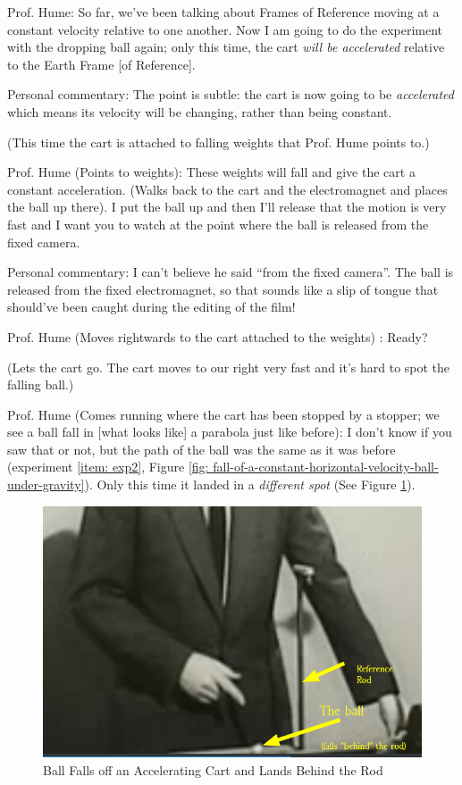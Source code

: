 \documentclass[a6paper]{article}
\newcommand{\perscom}[1]{
    {\footnotesize Personal commentary:  #1}
}
\begin{document}
Prof. Hume: So far, we've been talking about Frames of Reference moving at a constant velocity relative to one another. Now I am going to do the experiment with the dropping ball again; only this time, the cart \emph{will be accelerated} relative to the Earth Frame [of Reference].

\perscom{ The point is subtle: the cart is now going to be \emph{accelerated} which means its velocity will be changing, rather than being constant.}

(This time the cart is attached to falling weights that Prof. Hume points to.)

Prof. Hume (Points to weights): These weights will fall and give the cart a constant acceleration. (Walks back to the cart and the electromagnet and places the ball up there). I put the ball up and then I'll release that the motion is very fast and I want you to watch at the point where the ball is released from the fixed camera. 

\perscom{ I can't believe he said ``from the fixed camera''. The ball is released from the fixed electromagnet, so that sounds like a slip of tongue that should've been caught during the editing of the film! }

Prof. Hume (Moves rightwards to the cart attached to the weights) : Ready? 

(Lets the cart go. The cart moves to our right very fast and it's hard to spot the falling ball.)

Prof. Hume (Comes running where the cart has been stopped by a stopper; we see a ball fall in [what looks like] a parabola just like before): I don't know if you saw that or not, but the path of the ball was the same as it was before (experiment \ref{item: exp2}, Figure \ref{fig: fall-of-a-constant-horizontal-velocity-ball-under-gravity}). Only this time it landed in a \emph{different spot} (See Figure \ref{fig: ball-falls-off-an-accelerating-cart}). 

\begin{figure}
    \centering
    \includegraphics[width=0.7\linewidth]{ball-falls-off-an-accelerating-cart.png}
    \caption{Ball Falls off an Accelerating Cart and Lands Behind the Rod}
    \label{fig: ball-falls-off-an-accelerating-cart}
\end{figure}
\end{document}
